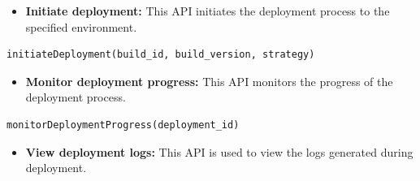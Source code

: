 \begin{itemize}
\item
\protect{}\label{dISNpB6aHZaG9JGysnP9t}
\textbf{Initiate deployment:} This API initiates the deployment process to the specified environment.
\end{itemize}

\begin{lstlisting}[language=c++17]
initiateDeployment(build_id, build_version, strategy)
\end{lstlisting}

\begin{table}[htbp]
\centering
\small
{}
\end{table}

\begin{itemize}
\item
\protect{}\label{SjJiGevUdYbp50sp6n30N}
\textbf{Monitor deployment progress:} This API monitors the progress of the deployment process.
\end{itemize}

\begin{lstlisting}[language=c++17]
monitorDeploymentProgress(deployment_id)
\end{lstlisting}

\begin{table}[htbp]
\centering
\small
{}
\end{table}

\begin{itemize}
\item
\protect{}\label{KBUQCy6f4QmhVlR9rZNZH}
\textbf{View deployment logs:} This API is used to view the logs generated during deployment.
\end{itemize}

